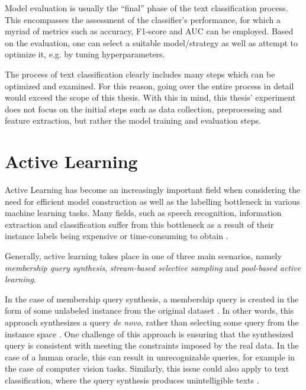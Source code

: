 \documentclass[english,bachelor,ul]{webisthesis} %
\begin{document}
Model evaluation is usually the ``final'' phase of the text classification process. This encompasses the assessment of the classifier's performance, for which a myriad of metrics such as accuracy, F1-score and AUC can be employed. Based on the evaluation, one can select a suitable model/strategy as well as attempt to optimize it, e.g. by tuning hyperparameters.

The process of text classification clearly includes many steps which can be optimized and examined. For this reason, going over the entire process in detail would exceed the scope of this thesis. With this in mind, this thesis' experiment does not focus on the initial steps such as data collection, preprocessing and feature extraction, but rather the model training and evaluation steps.


\section{Active Learning}

Active Learning has become an increasingly important field when considering the need for efficient model construction as well as the labelling bottleneck in various machine learning tasks. Many fields, such as speech recognition, information extraction and classification suffer from this bottleneck as a result of their instance labels being expensive or time-consuming to obtain \citep{settles.tr09}. 

Generally, active learning takes place in one of three main scenarios, namely \textit{membership query synthesis}, \textit{stream-based selective sampling} and \textit{pool-based active learning}. 

In the case of membership query synthesis, a membership query is created in the form of some unlabeled instance from the original dataset \citep{DBLP:journals/ml/Angluin87, DBLP:journals/ijon/WangHYL15}. In other words, this approach synthesizes a query \textit{de novo}, rather than selecting some query from the instance space \citep{settles.tr09}. One challenge of this approach is ensuring that the synthesized query is consistent with meeting the constraints imposed by the real data. In the case of a human oracle, this can result in unrecognizable queries, for example in the case of computer vision tasks. Similarly, this issue could also apply to text classification, where the query synthesis produces unintelligible texts \citep{langbaum92}.%
\end{document}
